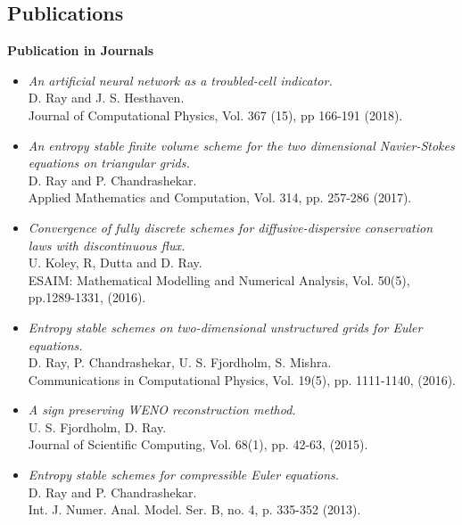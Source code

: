 \documentclass[margin]{res}
\begin{document}
\begin{resume}
 \section{Publications}

\textbf{Publication in Journals}                
            \begin{itemize}            
   
           \item {\it An artificial neural network as a troubled-cell indicator.}\\
            D. Ray and J. S. Hesthaven.\\
            Journal of Computational Physics, Vol. 367 (15), pp 166-191 (2018).

            \item {\it An entropy stable finite volume scheme for the two dimensional Navier-Stokes equations on triangular grids.}\\
            D. Ray and P. Chandrashekar.\\
             Applied Mathematics and Computation, Vol. 314, pp. 257-286 (2017).

             \item {\it Convergence of fully discrete schemes for diffusive-dispersive conservation laws with discontinuous flux.}\\
              U. Koley, R, Dutta and D. Ray. \\
              ESAIM: Mathematical Modelling and Numerical Analysis, Vol. 50(5), pp.1289-1331, (2016).
              
              \item {\it Entropy stable schemes on two-dimensional unstructured grids for Euler equations.}\\
              D. Ray, P. Chandrashekar, U. S. Fjordholm, S. Mishra. \\
              Communications in Computational Physics, Vol. 19(5), pp. 1111-1140, (2016).
            
              \item {\it A sign preserving WENO reconstruction method.}\\
              U. S. Fjordholm, D. Ray. \\
              Journal of Scientific Computing, Vol. 68(1), pp. 42-63, (2015).
             
              \item {\it Entropy stable schemes for compressible Euler equations.}\\
              D. Ray and P. Chandrashekar.\\
              Int. J. Numer. Anal. Model. Ser. B, no. 4, p. 335-352 (2013).
             \end{itemize}




\end{resume}
\end{document}
